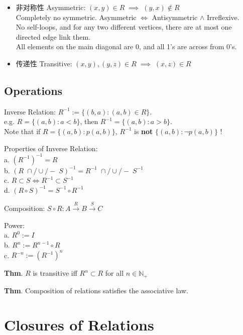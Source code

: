 \documentclass[12pt, a4paper, UTF8, openany]{ctexbook}
\newcommand{\field}[1]{\mathbb{#1}}%
\begin{document}
\begin{itemize}
                All 1's are across from 0's.
            \item 非对称性 Asymmetric: $(x, y) \in R \; \implies \; (y, x) \notin R$ \\
                Completely no symmetric. Asymmetric $\iff$ Antisymmetric $\land$ Irreflexive. \\
                No self-loops, and for any two different vertices, there are at most one directed edge link them. \\
                All elements on the main diagonal are 0, and all 1's are across from 0's.
            \item 传递性 Transitive: $(x, y), (y, z) \in R \; \implies \; (x, z) \in R$
        \end{itemize}
        
    \subsection{Operations}
        Inverse Relation:
        $R^{-1} := \{(b, a): (a, b) \in R\}$.\\
        e.g. $R = \{(a, b): a < b\}$, then $R^{-1} = \{(a, b): a > b\}$.\\
        Note that if $R = \{(a, b): p(a, b)\}$, $R^{-1}$ is \textbf{not} $\{(a, b): \lnot p(a, b)\}$ !

        Properties of Inverse Relation:\\
        a. $(R^{-1})^{-1} = R$ \\
        b. $(R \; \cap/\cup/- \; S)^{-1} = R^{-1} \;\cap/\cup/- \; S^{-1}$ \\
        c. $R \subset S \iff R^{-1} \subset S^{-1}$ \\
        d. $(R \circ S)^{-1} = S^{-1} \circ R^{-1}$

        Composition:
        $S \circ R: A \mathop\to\limits^{R} B \mathop\to\limits^{S} C$
        
        Power:\\
        a. $R^0 := I$\\
        b. $R^n := R^{n - 1} \circ R$\\
        c. $R^{-n} := (R^{-1})^n$
        
        \textbf{Thm}. $R$ is transitive iff $R^n \subset R$ for all $n \in \field{N}_+$
        
        \textbf{Thm}. Composition of relations satisfies the associative law.
        
    \section{Closures of Relations}
\end{document}
